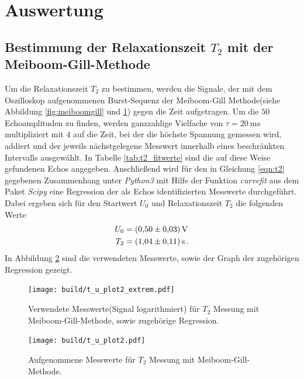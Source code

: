 \newpage
\section{Auswertung}
\label{sec:Auswertung}

\subsection{Bestimmung der Relaxationszeit $T_{2}$ mit der Meiboom-Gill-Methode}
\label{subsec:T2}

Um die Relaxationszeit $T_{2}$ zu bestimmen, werden die Signale, der mit dem Oszilloskop aufgenommenen
Burst-Sequenz der Meiboom-Gill Methode(siehe Abbildung \ref{fig:meiboomgill} und \ref{fig:t2_gesamt}) gegen die Zeit aufgetragen.
Um die $50$ Echoamplituden zu finden, werden ganzzahlige Vielfache von $\tau = \SI{20}{\milli\second}$ multipliziert mit $4$
auf die Zeit, bei der die höchste Spannung gemessen wird, addiert und der jeweils nächstgelegene Messwert innerhalb eines beschränkten Intervalls ausgewählt.
In Tabelle \ref{tab:t2_fitwerte}
sind die auf diese Weise gefundenen Echos angegeben.
Anschließend wird für den in Gleichung \eqref{eqn:t2} gegebenen Zusammenhang unter \textit{Python3} mit Hilfe der Funktion \textit{curvefit} aus
dem Paket \textit{Scipy} eine Regression der als Echos identifizierten Messwerte durchgeführt.\\
Dabei ergeben sich für den Startwert $U_{0}$ und Relaxationszeit $T_{2}$ die folgenden Werte
\begin{align*}
  U_{0} &= \SI{0.50+-0.03}{\volt} \\
  T_{2} &= \SI{ 1.04+-0.11}{\second} \, .
\end{align*}
In Abbildung \ref{fig:t2_plot} sind die verwendeten Messwerte, sowie der Graph der zugehörigen Regression
gezeigt.\\


\begin{figure}[hhh]
  \centering
  \texttt{[image: build/t\_u\_plot2\_extrem.pdf]}
  \caption{Verwendete Messwerte(Signal logarithmiert) für $T_{2}$ Messung mit Meiboom-Gill-Methode, sowie zugehörige Regression.}
  \label{fig:t2_gesamt}
\end{figure}


\begin{figure}[hhh]
  \centering
  \texttt{[image: build/t\_u\_plot2.pdf]}
  \caption{Aufgenommene Messwerte für $T_{2}$ Messung mit Meiboom-Gill-Methode.}
  \label{fig:t2_plot}
\end{figure}



